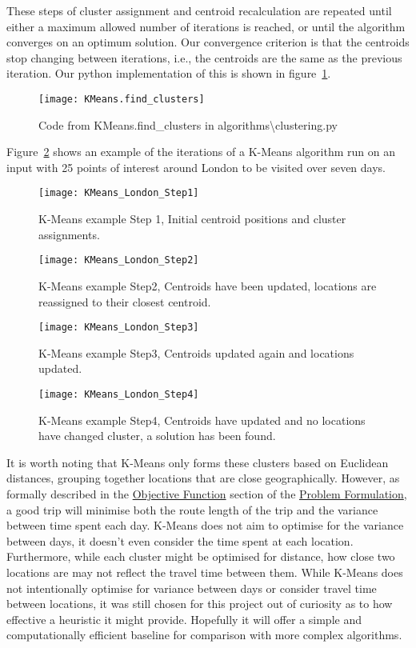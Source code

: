 \noindent
These steps of cluster assignment and centroid recalculation are repeated until either a maximum allowed number of
iterations is reached, or until the algorithm converges on an optimum solution.
Our convergence criterion is that the centroids stop changing between iterations, i.e., the centroids are the same
as the previous iteration.
Our python implementation of this is shown in figure~\ref{fig:KMeans.find_clusters}.
\begin{figure}[H]
    \centering
    \texttt{[image: KMeans.find\_clusters]}
    \caption{Code from KMeans.find\_clusters in algorithms\textbackslash clustering.py}\label{fig:KMeans.find_clusters}
\end{figure}

\noindent
Figure~\ref{fig:KMeans_London_Step1} shows an example of the iterations of a K-Means algorithm run on an input with 25
points of interest around London to be visited over seven days.
\begin{figure}[H]
    \ContinuedFloat*
    \texttt{[image: KMeans\_London\_Step1]}
    \caption{K-Means example Step 1, Initial centroid positions and cluster assignments.}\label{fig:KMeans_London_Step1}
\end{figure}
\begin{figure}[H]
    \ContinuedFloat
    \texttt{[image: KMeans\_London\_Step2]}
    \caption{K-Means example Step2, Centroids have been updated, locations are reassigned to their closest centroid.}\label{fig:KMeans_London_Step2}
\end{figure}
\begin{figure}[H]
    \ContinuedFloat
    \texttt{[image: KMeans\_London\_Step3]}
    \caption{K-Means example Step3, Centroids updated again and locations updated.}\label{fig:KMeans_London_Step3}
\end{figure}
\begin{figure}[H]
    \ContinuedFloat
    \texttt{[image: KMeans\_London\_Step4]}
    \caption{K-Means example Step4, Centroids have updated and no locations have changed cluster, a solution has been found.}\label{fig:KMeans_London_Step4}
\end{figure}

\noindent
It is worth noting that K-Means only forms these clusters based on Euclidean distances, grouping together locations
that are close geographically.
However, as formally described in the \hyperref[subsec:objective-function]{Objective Function} section of the
\hyperref[sec:problem-formulation]{Problem Formulation}, a good trip will minimise both the route length of the trip
and the variance between time spent each day.
K-Means does not aim to optimise for the variance between days, it doesn't even consider the time spent at each
location.
Furthermore, while each cluster might be optimised for distance, how close two locations are may not reflect the travel
time between them.
While K-Means does not intentionally optimise for variance between days or consider travel time between locations, it
was still chosen for this project out of curiosity as to how effective a heuristic it might provide.
Hopefully it will offer a simple and computationally efficient baseline for comparison with more complex
algorithms.

